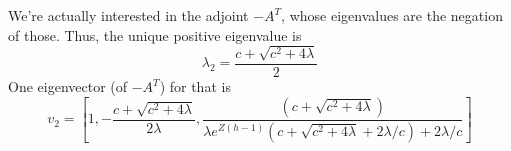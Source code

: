 \documentclass[10pt]{article}
\begin{document}
We're actually interested in the adjoint $-A^T$, whose eigenvalues are the negation of those.
Thus, the unique positive eigenvalue is
\[\lambda_2 = \frac{c + \sqrt{c^2 + 4 \lambda}}{2} \]
One eigenvector (of $-A^T$) for that is
\[
v_2 = \left[1, -\frac{c + \sqrt{c^2 + 4 \lambda}}{2\lambda}, \frac{(c + \sqrt{c^2+4\lambda})}{\lambda e^{Z(h-1)}(c + \sqrt{c^2+4\lambda} + 2 \lambda/c)+ 2 \lambda / c}\right]
\]
\end{document}
